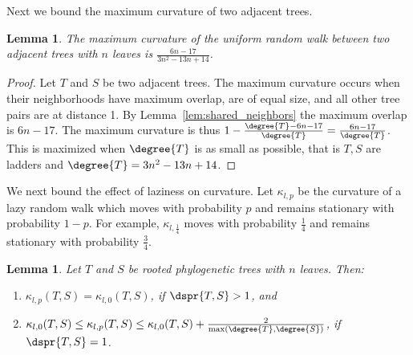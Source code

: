 \documentclass{amsart}
\newtheorem{lemma}[theorem]{Lemma}
\begin{document}
Next we bound the maximum curvature of two adjacent trees.

\begin{lemma}
	The maximum curvature of the uniform random walk between two adjacent trees with $n$ leaves is $\frac{6n-17}{3n^2-13n+14}$. 
\end{lemma}
\begin{proof}
Let $T$ and $S$ be two adjacent trees.
The maximum curvature occurs when their neighborhoods have maximum overlap, are of equal size, and all other tree pairs are at distance 1.
By Lemma~\ref{lem:shared_neighbors} the maximum overlap is $6n-17$.
The maximum curvature is thus $1 - \frac{\degree{T} - 6n-17}{\degree{T}} = \frac{6n - 17}{\degree{T}}$. This is maximized when $\degree{T}$ is as small as possible, that is $T,S$ are ladders and $\degree{T} = 3n^2 - 13n + 14$.
\end{proof}

We next bound the effect of laziness on curvature. Let $\kappa_{l,p}$ be the curvature of a lazy random walk which moves with probability $p$ and remains stationary with probability $1 - p$. 
For example, $\kappa_{l,\frac{1}{4}}$ moves with probability $\frac{1}{4}$ and remains stationary with probability $\frac{3}{4}$. 

\begin{lemma}
	Let $T$ and $S$ be rooted phylogenetic trees with $n$ leaves.
	Then:
	\begin{enumerate}
		\item	$\kappa_{l,p}(T,S) = \kappa_{l,0}(T,S)$, if $\dspr{T,S} > 1$, and
		\item	$\kappa_{l,0}(T,S) \le \kappa_{l,p}(T,S) \le \kappa_{l,0}(T,S) + \frac{2}{\max(\degree{T}, \degree{S})}$, if $\dspr{T,S} = 1$.
	\end{enumerate}
\end{lemma}
\end{document}
